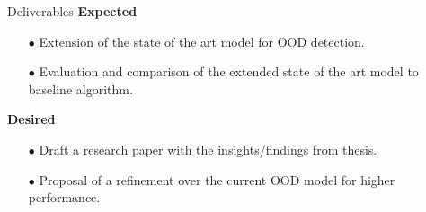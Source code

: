\documentclass[aspectratio=169]{beamer}
\begin{document}
\begin{frame}{Deliverables}
    \textbf{Expected}
    \begin{itemize}
        \item[$\bullet$] Extension of the state of the art model for OOD detection.
        \item[$\bullet$] Evaluation and comparison of the extended state of the art model to baseline algorithm.
    \end{itemize}
    \textbf{Desired}
    \begin{itemize}
        \item[$\bullet$] Draft a research paper with the insights/findings from thesis.
        \item[$\bullet$] Proposal of a refinement over the current OOD model for higher performance.
    \end{itemize}
\end{frame}


\end{document}
